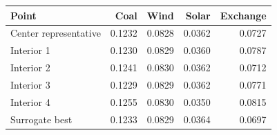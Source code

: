 \begin{tabular}{@{}lrrrr@{}}\toprule
Point & Coal & Wind & Solar & Exchange \\ \midrule
Center representative & 0.1232 & 0.0828 & 0.0362 & 0.0727 \\
Interior 1 & 0.1230 & 0.0829 & 0.0360 & 0.0787 \\
Interior 2 & 0.1241 & 0.0830 & 0.0362 & 0.0712 \\
Interior 3 & 0.1229 & 0.0829 & 0.0362 & 0.0771 \\
Interior 4 & 0.1255 & 0.0830 & 0.0350 & 0.0815 \\
Surrogate best & 0.1233 & 0.0829 & 0.0364 & 0.0697 \\
\bottomrule\end{tabular}
